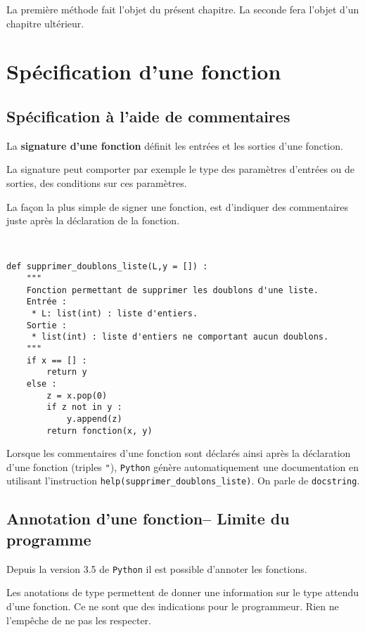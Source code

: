 La première méthode fait l'objet du présent chapitre. La seconde fera l'objet d'un chapitre ultérieur. 




\section{Spécification d'une fonction}

\subsection{Spécification à l'aide de commentaires}
\begin{defi}
La \textbf{signature d'une fonction} définit les entrées et les sorties d'une fonction. 
\end{defi}

La signature peut comporter par exemple le type  des paramètres d'entrées ou de sorties, des conditions sur ces paramètres. 

La façon la plus simple de signer une fonction, est d'indiquer des commentaires juste après la déclaration de la fonction. 

\begin{exemple}~\\
\begin{lstlisting}
def supprimer_doublons_liste(L,y = []) :
    """
    Fonction permettant de supprimer les doublons d'une liste.
    Entrée : 
     * L: list(int) : liste d'entiers. 
    Sortie : 
     * list(int) : liste d'entiers ne comportant aucun doublons.
    """
    if x == [] : 
        return y
    else : 
        z = x.pop(0)
        if z not in y : 
            y.append(z)
        return fonction(x, y)
\end{lstlisting}

Lorsque les commentaires d'une fonction sont déclarés ainsi après la déclaration d'une fonction (triples \texttt{"}), \texttt{Python} génère automatiquement une documentation en utilisant l'instruction \texttt{help(supprimer\_doublons\_liste)}. On parle de \texttt{docstring}.
\end{exemple}


\subsection{Annotation d'une fonction-- Limite du programme}

Depuis la version 3.5 de \texttt{Python} il est possible d'annoter les fonctions. 
\begin{defi} Les anotations de type permettent de donner une information sur le type attendu d'une fonction. Ce ne sont que des indications pour le programmeur. Rien ne l'empêche de ne pas les respecter. 
\end{defi}

